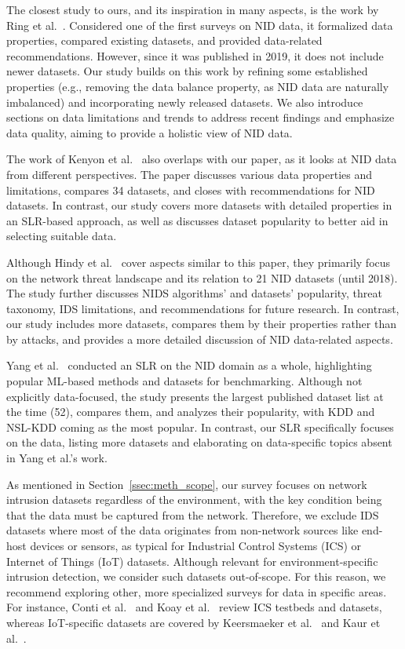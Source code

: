 The closest study to ours, and its inspiration in many aspects, is the work by Ring et al.~\cite{ring2019_nids_datasets_survey}. Considered one of the first surveys on NID data, it formalized data properties, compared existing datasets, and provided data-related recommendations. However, since it was published in 2019, it does not include newer datasets. Our study builds on this work by refining some established properties (e.g., removing the data balance property, as NID data are naturally imbalanced) and incorporating newly released datasets. We also introduce sections on data limitations and trends to address recent findings and emphasize data quality, aiming to provide a holistic view of NID data.

The work of Kenyon et al.~\cite{kenyon2020_public_ids_datasets_fit} also overlaps with our paper, as it looks at NID data from different perspectives. The paper discusses various data properties and limitations, compares 34 datasets, and closes with recommendations for NID datasets. In contrast, our study covers more datasets with detailed properties in an SLR-based approach, as well as discusses dataset popularity to better aid in selecting suitable data.

Although Hindy et al.~\cite{hindy2020_network_threats_taxonomy} cover aspects similar to this paper, they primarily focus on the network threat landscape and its relation to 21 NID datasets (until 2018). The study further discusses NIDS algorithms' and datasets' popularity, threat taxonomy, IDS limitations, and recommendations for future research. In contrast, our study includes more datasets, compares them by their properties rather than by attacks, and provides a more detailed discussion of NID data-related aspects.

Yang et al.~\cite{yang2022_slr_anids} conducted an SLR on the NID domain as a whole, highlighting popular ML-based methods and datasets for benchmarking. Although not explicitly data-focused, the study presents the largest published dataset list at the time (52), compares them, and analyzes their popularity, with KDD and NSL-KDD coming as the most popular. In contrast, our SLR specifically focuses on the data, listing more datasets and elaborating on data-specific topics absent in Yang et al.'s work.

As mentioned in Section~\ref{ssec:meth_scope}, our survey focuses on network intrusion datasets regardless of the environment, with the key condition being that the data must be captured from the network. Therefore, we exclude IDS datasets where most of the data originates from non-network sources like end-host devices or sensors, as typical for Industrial Control Systems (ICS) or Internet of Things (IoT) datasets. Although relevant for environment-specific intrusion detection, we consider such datasets out-of-scope. For this reason, we recommend exploring other, more specialized surveys for data in specific areas. For instance, Conti et al.~\cite{conti2021_survey_ics_testbeds_datasets} and Koay et al.~\cite{koay2023_ml_ics_landscape} review ICS testbeds and datasets, whereas IoT-specific datasets are covered by Keersmaeker et al.~\cite{keersmaeker2023_survey_public_iot_datasets} and Kaur et al.~\cite{kaur2023_iot_security_dataset_evolution}.

